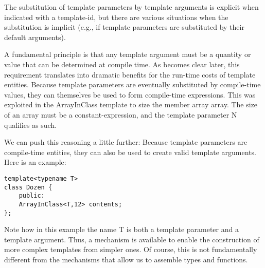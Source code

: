 The substitution of template parameters by template arguments is explicit when indicated with a template-id, but there are various situations when the substitution is implicit (e.g., if template parameters are substituted by their default arguments).

A fundamental principle is that any template argument must be a quantity or value that can be determined at compile time. As becomes clear later, this requirement translates into dramatic benefits for the run-time costs of template entities. Because template parameters are eventually substituted by compile-time values, they can themselves be used to form compile-time expressions. This was exploited in the ArrayInClass template to size the member array array. The size of an array must be a constant-expression, and the template parameter N qualifies as such.

We can push this reasoning a little further: Because template parameters are compile-time entities, they can also be used to create valid template arguments. Here is an example:

\begin{lstlisting}[style=styleCXX]
template<typename T>
class Dozen {
	public:
	ArrayInClass<T,12> contents;
};
\end{lstlisting}

Note how in this example the name T is both a template parameter and a template argument. Thus, a mechanism is available to enable the construction of more complex templates from simpler ones. Of course, this is not fundamentally different from the mechanisms that allow us to assemble types and functions.


























